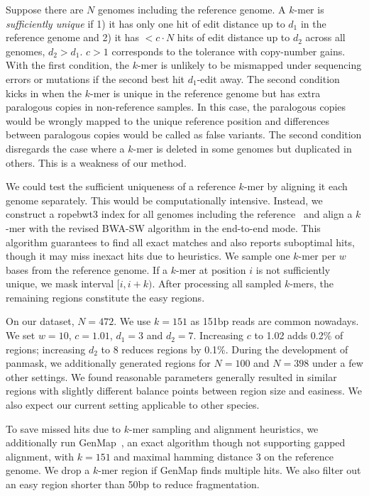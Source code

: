 \documentclass[webpdf,contemporary,large,namedate]{oup-authoring-template}%
\begin{document}
Suppose there are $N$ genomes including the reference genome.
A $k$-mer is \emph{sufficiently unique}
if 1) it has only one hit of edit distance up to $d_1$ in the reference genome
and 2) it has $<c\cdot N$ hits of edit distance up to $d_2$ across all genomes, $d_2>d_1$.
$c>1$ corresponds to the tolerance with copy-number gains.
With the first condition, the $k$-mer is unlikely to be mismapped under sequencing errors or mutations if the second best hit $d_1$-edit away.
The second condition kicks in when the $k$-mer is unique in the reference genome but has extra paralogous copies in non-reference samples.
In this case, the paralogous copies would be wrongly mapped to the unique reference position and
differences between paralogous copies would be called as false variants.
The second condition disregards the case where a $k$-mer is deleted in some genomes but duplicated in others.
This is a weakness of our method.

We could test the sufficient uniqueness of a reference $k$-mer by aligning it each genome separately.
This would be computationally intensive.
Instead, we construct a ropebwt3 index for all genomes including the reference~\citep{Li:2024ac}
and align a $k$-mer with the revised BWA-SW algorithm in the end-to-end mode.
This algorithm guarantees to find all exact matches and also reports suboptimal hits,
though it may miss inexact hits due to heuristics.
We sample one $k$-mer per $w$ bases from the reference genome.
If a $k$-mer at position $i$ is not sufficiently unique, we mask interval $[i,i+k)$.
After processing all sampled $k$-mers, the remaining regions constitute the easy regions.

On our dataset, $N=472$.
We use $k=151$ as 151bp reads are common nowadays.
We set $w=10$, $c=1.01$, $d_1=3$ and $d_2=7$.
Increasing $c$ to 1.02 adds 0.2\% of regions; increasing $d_2$ to 8 reduces regions by 0.1\%.
During the development of panmask, we additionally generated regions for $N=100$ and $N=398$ under a few other settings.
We found reasonable parameters generally resulted in similar regions with slightly different balance points between region size and easiness.
We also expect our current setting applicable to other species.

To save missed hits due to $k$-mer sampling and alignment heuristics,
we additionally run GenMap~\citep{Pockrandt:2020aa}, an exact algorithm though not supporting gapped alignment, with $k=151$ and maximal hamming distance 3 on the reference genome.
We drop a $k$-mer region if GenMap finds multiple hits.
We also filter out an easy region shorter than 50bp to reduce fragmentation.
\end{document}
